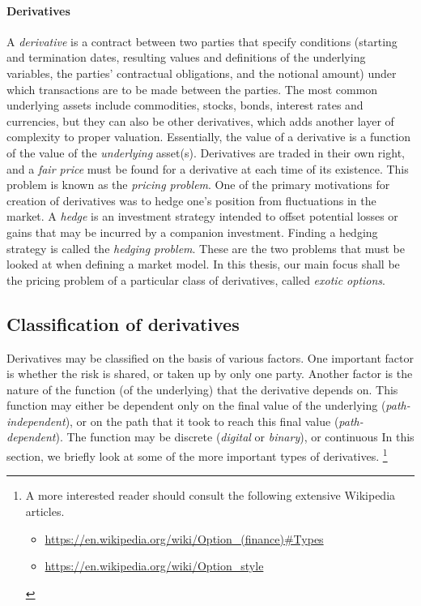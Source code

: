 \paragraph{Derivatives}
A \emph{derivative} is a contract between two parties that specify conditions (starting and termination dates, resulting values and definitions of the underlying variables, the parties' contractual obligations, and the notional amount) under which transactions are to be made between the parties. The most common underlying assets include commodities, stocks, bonds, interest rates and currencies, but they can also be other derivatives, which adds another layer of complexity to proper valuation. Essentially, the value of a derivative is a function of the value of the \emph{underlying} asset(s). Derivatives are traded in their own right, and a \emph{fair price} must be found for a derivative at each time of its existence. This problem is known as the \emph{pricing problem}. One of the primary motivations for creation of derivatives was to hedge one's position from fluctuations in the market. A \emph{hedge} is an investment strategy intended to offset potential losses or gains that may be incurred by a companion investment. Finding a hedging strategy is called the \emph{hedging problem}. These are the two problems that must be looked at when defining a market model. In this thesis, our main focus shall be the pricing problem of a particular class of derivatives, called \emph{exotic options}.


\subsection{Classification of derivatives}
\label{subsec:intro-derivative-classification}

Derivatives may be classified on the basis of various factors. One important factor is whether the risk is shared, or taken up by only one party. Another factor is the nature of the function (of the underlying) that the derivative depends on. This function may either be dependent only on the final value of the underlying (\emph{path-independent}), or on the path that it took to reach this final value (\emph{path-dependent}). The function may be discrete (\emph{digital} or \emph{binary}), or continuous In this section, we briefly look at some of the more important types of derivatives. \footnote{
	A more interested reader should consult the following extensive Wikipedia articles.
	\begin{itemize}
		\item \url{https://en.wikipedia.org/wiki/Option_(finance)\#Types}
		\item \url{https://en.wikipedia.org/wiki/Option_style}
	\end{itemize}
}


